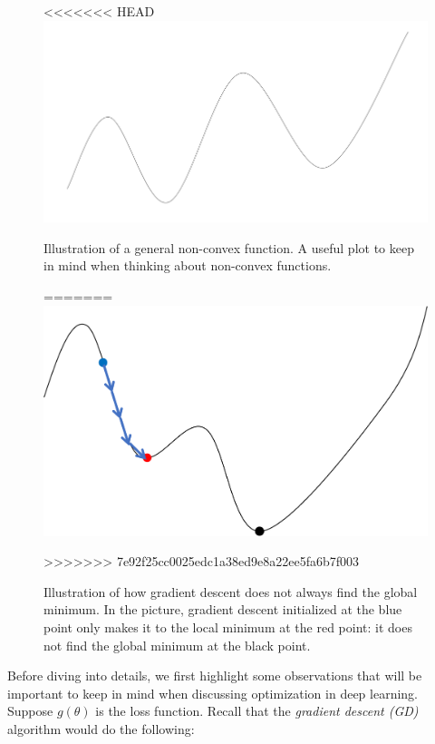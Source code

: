 \begin{figure}[H]
    \centering
<<<<<<< HEAD
    \includegraphics[scale = 0.3]{figures/smooth_func.png}
    \caption{Illustration of a general non-convex function. A useful plot to keep in mind when thinking about non-convex functions. }
    \label{lec10:fig:smooth_func}
=======
    \includegraphics[scale = 0.3]{figures/gradient_descent.png}
    \caption{Illustration of how gradient descent does not always find the global minimum. In the picture, gradient descent initialized at the blue point only makes it to the local minimum at the red point: it does not find the global minimum at the black point.}
    \label{lec10:fig:gradient_descent}
>>>>>>> 7e92f25cc0025edc1a38ed9e8a22ee5fa6b7f003
\end{figure}
Before diving into details, we first highlight some observations that will be important to keep in mind when discussing optimization in deep learning. Suppose $g(\theta)$ is the loss function. Recall that the \textit{gradient descent (GD)} algorithm would do the following:
